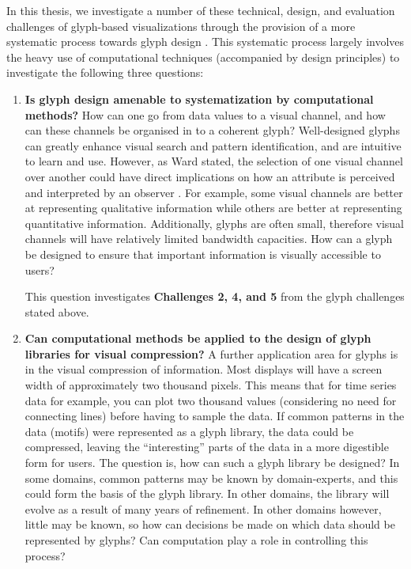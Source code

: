 In this thesis, we investigate a number of these technical, design, and evaluation challenges of glyph-based visualizations through the provision of a more systematic process towards glyph design .
This systematic process largely involves the heavy use of computational techniques (accompanied by design principles) to investigate the following three questions:

\begin{enumerate}
\item \textbf{Is glyph design amenable to systematization by computational methods?}
How can one go from data values to a visual channel, and how can these channels be organised in to a coherent glyph?
Well-designed glyphs can greatly enhance visual search and pattern identification, and are intuitive to learn and use.
However, as Ward stated, the selection of one visual channel over another could have direct implications on how an attribute is perceived and interpreted by an observer \cite{ward02}.
For example, some visual channels are better at representing qualitative information while others are better at representing quantitative information.
Additionally, glyphs are often small, therefore visual channels will have relatively limited bandwidth capacities.
How can a glyph be designed to ensure that important information is visually accessible to users?

This question investigates \textbf{Challenges 2, 4, and 5} from the glyph challenges stated above.


\item \textbf{Can computational methods be applied to the design of glyph libraries for visual compression?}
A further application area for glyphs is in the visual compression of information.
Most displays will have a screen width of approximately two thousand pixels.
This means that for time series data for example, you can plot two thousand values (considering no need for connecting lines) before having to sample the data.
If common patterns in the data (motifs) were represented as a glyph library, the data could be compressed, leaving the ``interesting'' parts of the data in a more digestible form for users.
The question is, how can such a glyph library be designed?
In some domains, common patterns may be known by domain-experts, and this could form the basis of the glyph library.
In other domains, the library will evolve as a result of many years of refinement.
In other domains however, little may be known, so how can decisions be made on which data should be represented by glyphs?
Can computation play a role in controlling this process?


\end{enumerate}
